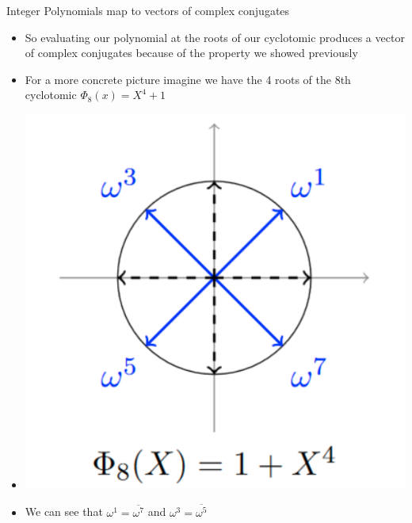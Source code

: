 \documentclass{beamer}
\begin{document}
\begin{frame}{Integer Polynomials map to vectors of complex conjugates}
	\begin{itemize}[<+->]
		\item So evaluating our polynomial at the roots of our cyclotomic produces a vector
		of complex conjugates because of the property we showed previously
		\item For a more concrete picture imagine we have the 4 roots of the 8th cyclotomic
		$\Phi_8(x) = X^4 + 1$
		\item \includegraphics[scale=0.1]{roots.png}
		\item We can see that $\omega^1 = \overline{\omega^7}$ and $\omega^3 = \overline{\omega^5}$
	\end{itemize}
\end{frame}
\end{document}
